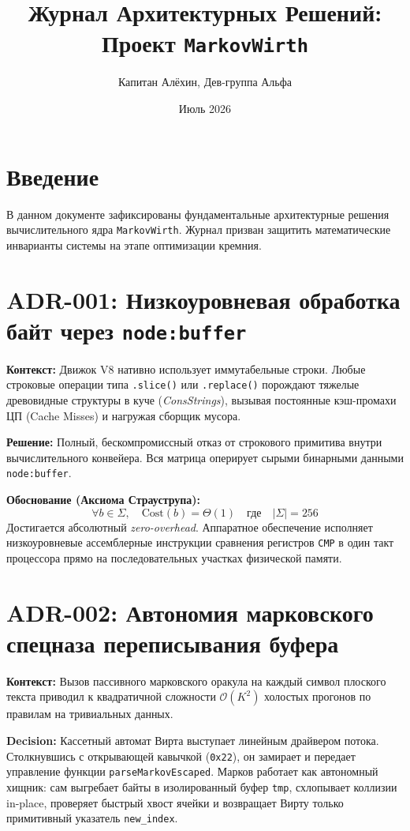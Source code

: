 \documentclass[12pt,a4paper]{article}
\begin{document}
\title{Журнал Архитектурных Решений: Проект \texttt{MarkovWirth}}
\author{Капитан Алёхин, Дев-группа Альфа}
\date{Июль 2026}
\maketitle

\section*{Введение}
В данном документе зафиксированы фундаментальные архитектурные решения вычислительного ядра \texttt{MarkovWirth}. Журнал призван защитить математические инварианты системы на этапе оптимизации кремния.

\section*{ADR-001: Низкоуровневая обработка байт через \texttt{node:buffer}}
\textbf{Контекст:} Движок V8 нативно использует иммутабельные строки. Любые строковые операции типа \texttt{.slice()} или \texttt{.replace()} порождают тяжелые древовидные структуры в куче (\textit{ConsStrings}), вызывая постоянные кэш-промахи ЦП (Cache Misses) и нагружая сборщик мусора.

\textbf{Решение:} Полный, бескомпромиссный отказ от строкового примитива внутри вычислительного конвейера. Вся матрица оперирует сырыми бинарными данными \texttt{node:buffer}.

\textbf{Обоснование (Аксиома Страуструпа):} 
\[\forall b \in \Sigma, \quad \text{Cost}(b) = \Theta(1) \quad \text{где} \quad \vert{}\Sigma\vert{} = 256\]
Достигается абсолютный \textit{zero-overhead}. Аппаратное обеспечение исполняет низкоуровневые ассемблерные инструкции сравнения регистров \texttt{CMP} в один такт процессора прямо на последовательных участках физической памяти.

\section*{ADR-002: Автономия марковского спецназа переписывания буфера}
\textbf{Контекст:} Вызов пассивного марковского оракула на каждый символ плоского текста приводил к квадратичной сложности $\mathcal{O}(K^2)$ холостых прогонов по правилам на тривиальных данных.

\textbf{Decision:} Кассетный автомат Вирта выступает линейным драйвером потока. Столкнувшись с открывающей кавычкой (\texttt{0x22}), он замирает и передает управление функции \texttt{parseMarkovEscaped}. Марков работает как автономный хищник: сам выгребает байты в изолированный буфер \texttt{tmp}, схлопывает коллизии in-place, проверяет быстрый хвост ячейки и возвращает Вирту только примитивный указатель \texttt{new\_index}.
\end{document}
